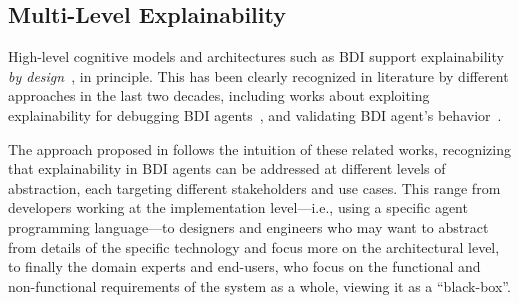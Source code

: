 \subsection{Multi-Level Explainability}

High-level cognitive models and architectures such as \ac{BDI} support explainability \textit{by design}~\cite{Harbers10,Broekens10}, in principle.
%
%
This has been clearly recognized in literature by different approaches in the last two decades, including works about exploiting explainability for debugging BDI agents~\cite{10.1007/978-3-642-32729-2_3,Winikoff2017why}, and validating BDI agent's behavior~\cite{winikoff2022badcoffee}. 

The approach proposed in \cite{DBLP:journals/aamas/YanBHR25} follows the intuition of these related works, recognizing that explainability in \ac{BDI} agents can be addressed at different levels of abstraction, each targeting different stakeholders and use cases.
This range from developers working at the implementation level---i.e., using a specific agent programming language---to designers and engineers who may want to abstract from details of the specific technology and focus more on the architectural level, to finally the domain experts and end-users,  who focus on the functional and non-functional requirements of the system as a whole, viewing it as a ``black-box''.

